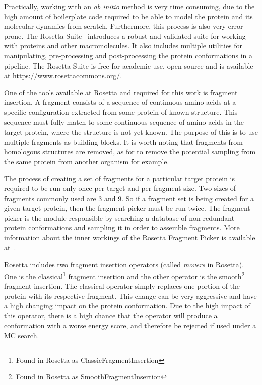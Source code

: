 Practically, working with an \textit{ab initio} method is very time consuming, due to the high amount of boilerplate code required to be able to model the protein and its molecular dynamics from scratch. Furthermore, this process is also very error prone. The Rosetta Suite~\cite{rohl2004protein} introduces a robust and validated suite for working with proteins and other macromolecules. It also includes multiple utilities for manipulating, pre-processing and post-processing the protein conformations in a pipeline. The Rosetta Suite is free for academic use, open-source and is available at \url{https://www.rosettacommons.org/}.

One of the tools available at Rosetta and required for this work is fragment insertion. A fragment consists of a sequence of continuous amino acids at a specific configuration extracted from some protein of known structure. This sequence must fully match to some continuous sequence of amino acids in the target protein, where the structure is not yet known. The purpose of this is to use multiple fragments as building blocks. It is worth noting that fragments from homologous structures are removed, as for to remove the potential sampling from the same protein from another organism for example.

The process of creating a set of fragments for a particular target protein
is required to be run only once per target and per fragment size. Two sizes of
fragments commonly used are 3 and 9. So if a fragment set is being created
for a given target protein, then the fragment picker must be run twice. The
fragment picker is the module responsible by searching a database of
non redundant protein conformations and sampling it in order to assemble
fragments. More information about the inner workings of the Rosetta Fragment
Picker is available at~\cite{gront2011generalized}.

Rosetta includes two fragment insertion operators (called \textit{movers} in Rosetta). One is the classical\footnote{Found in Rosetta as ClassicFragmentInsertion} fragment insertion and the other operator is the
smooth\footnote{Found in Rosetta as SmoothFragmentInsertion} fragment insertion. The classical operator simply replaces one portion of the protein with its respective fragment. This change can be very aggressive and have a high changing impact on the protein conformation. Due to the high impact of this operator, there is a high chance that the
operator will produce a conformation with a worse energy score, and therefore
be rejected if used under a \ac{MC} search.

